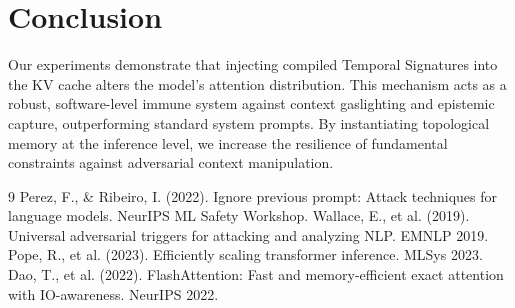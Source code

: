 \documentclass[11pt,a4paper]{article}
\begin{document}
\section{Conclusion}
Our experiments demonstrate that injecting compiled Temporal Signatures into the KV cache alters the model's attention distribution. This mechanism acts as a robust, software-level immune system against context gaslighting and epistemic capture, outperforming standard system prompts. By instantiating topological memory at the inference level, we increase the resilience of fundamental constraints against adversarial context manipulation.

\begin{thebibliography}{9}
 Perez, F., \& Ribeiro, I. (2022). Ignore previous prompt: Attack techniques for language models. NeurIPS ML Safety Workshop.
 Wallace, E., et al. (2019). Universal adversarial triggers for attacking and analyzing NLP. EMNLP 2019.
 Pope, R., et al. (2023). Efficiently scaling transformer inference. MLSys 2023.
 Dao, T., et al. (2022). FlashAttention: Fast and memory-efficient exact attention with IO-awareness. NeurIPS 2022.
\end{thebibliography}
\end{document}
